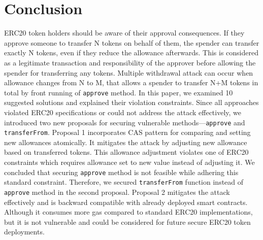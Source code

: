 
\section{Conclusion}

ERC20 token holders should be aware of their approval consequences. If they approve someone to transfer N tokens on behalf of them, the spender can transfer exactly N tokens, even if they reduce the allowance afterwards. This is considered as a legitimate transaction and responsibility of the approver before allowing the spender for transferring any tokens. Multiple withdrawal attack can occur when allowance changes from N to M, that allows a spender to transfer N+M tokens in total by front running of \texttt{approve} method. In this paper, we examined 10 suggested solutions and explained their violation constraints. Since all approaches violated ERC20 specifications or could not address the attack effectively, we introduced two new proposals for securing vulnerable methods---\texttt{approve} and \texttt{transferFrom}. Proposal 1 incorporates CAS pattern for comparing and setting new allowances atomically. It mitigates the attack by adjusting new allowance based on transferred tokens. This allowance adjustment violates one of ERC20 constraints which requires allowance set to new value instead of adjusting it. We concluded that securing \texttt{approve} method is not feasible while adhering this standard constraint. Therefore, we secured \texttt{transferFrom} function instead of \texttt{approve} method in the second proposal. Proposal 2 mitigates the attack effectively and is backward compatible with already deployed smart contracts. Although it consumes more gas compared to standard ERC20 implementations, but it is not vulnerable and could be considered for future secure ERC20 token deployments.